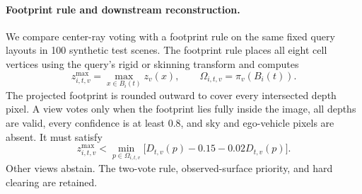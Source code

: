 \paragraph{Footprint rule and downstream reconstruction.}
We compare center-ray voting with a footprint rule on the same fixed query layouts in 100 synthetic test scenes. The footprint rule places all eight cell vertices using the query's rigid or skinning transform and computes
\begin{equation}
z^{\max}_{i,t,v}=\max_{x\in B_i(t)}z_v(x),\qquad
\Omega_{i,t,v}=\pi_v(B_i(t)).
\end{equation}
The projected footprint is rounded outward to cover every intersected depth pixel. A view votes only when the footprint lies fully inside the image, all depths are valid, every confidence is at least 0.8, and sky and ego-vehicle pixels are absent. It must satisfy
\begin{equation}
z^{\max}_{i,t,v}<\min_{p\in\Omega_{i,t,v}}
\bigl[D_{t,v}(p)-0.15-0.02D_{t,v}(p)\bigr].
\label{eq:footprint-free}
\end{equation}
Other views abstain. The two-vote rule, observed-surface priority, and hard clearing are retained.

